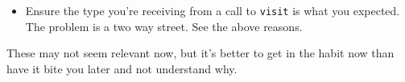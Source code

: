 \documentclass{article}
\newcommand{\code}[1]{\texttt{\textmd{#1}}}
\begin{document}
\begin{enumerate}
\begin{itemize}
        other words, don't return temporaries. For example, this will break if the receiving side
        wants a pointer to the parent class even though there's an available typesafe cast:
        \begin{lstlisting}
          {
            ...
            return std::make_shared<MyChildClass>(...);
          }
        \end{lstlisting}
      \item
        Ensure the type you're receiving from a call to \code{visit} is what you expected. The
        problem is a two way street. See the above reasons.
    \end{itemize}
    These may not seem relevant now, but it's better to get in the habit now than have it bite you
    later and not understand why.
\end{enumerate}
\end{document}
